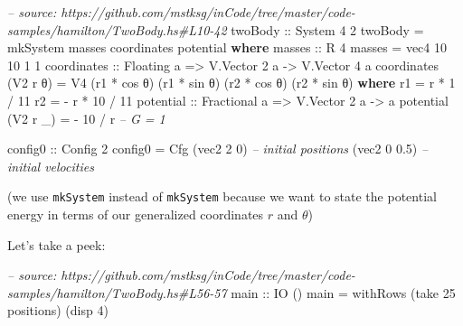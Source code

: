 \documentclass[]{article}
\newenvironment{Shaded}{}{}
\newcommand{\KeywordTok}[1]{\textcolor[rgb]{0.00,0.44,0.13}{\textbf{{#1}}}}
\newcommand{\DataTypeTok}[1]{\textcolor[rgb]{0.56,0.13,0.00}{{#1}}}
\newcommand{\DecValTok}[1]{\textcolor[rgb]{0.25,0.63,0.44}{{#1}}}
\newcommand{\FloatTok}[1]{\textcolor[rgb]{0.25,0.63,0.44}{{#1}}}
\newcommand{\CommentTok}[1]{\textcolor[rgb]{0.38,0.63,0.69}{\textit{{#1}}}}
\newcommand{\OtherTok}[1]{\textcolor[rgb]{0.00,0.44,0.13}{{#1}}}
\newcommand{\FunctionTok}[1]{\textcolor[rgb]{0.02,0.16,0.49}{{#1}}}
\newcommand{\NormalTok}[1]{{#1}}
\begin{document}
\begin{Shaded}
\begin{Highlighting}[]
\CommentTok{-- source: https://github.com/mstksg/inCode/tree/master/code-samples/hamilton/TwoBody.hs#L10-42}
\OtherTok{twoBody ::} \DataTypeTok{System} \DecValTok{4} \DecValTok{2}
\NormalTok{twoBody }\FunctionTok{=} \NormalTok{mkSystem masses coordinates potential}
  \KeywordTok{where}
\OtherTok{    masses ::} \DataTypeTok{R} \DecValTok{4}
    \NormalTok{masses }\FunctionTok{=} \NormalTok{vec4 }\DecValTok{10} \DecValTok{10} \DecValTok{1} \DecValTok{1}
    \NormalTok{coordinates}
\OtherTok{        ::} \DataTypeTok{Floating} \NormalTok{a}
        \OtherTok{=>} \DataTypeTok{V.Vector} \DecValTok{2} \NormalTok{a}
        \OtherTok{->} \DataTypeTok{V.Vector} \DecValTok{4} \NormalTok{a}
    \NormalTok{coordinates (}\DataTypeTok{V2} \NormalTok{r θ) }\FunctionTok{=} \DataTypeTok{V4} \NormalTok{(r1 }\FunctionTok{*} \NormalTok{cos θ) (r1 }\FunctionTok{*} \NormalTok{sin θ)}
                              \NormalTok{(r2 }\FunctionTok{*} \NormalTok{cos θ) (r2 }\FunctionTok{*} \NormalTok{sin θ)}
      \KeywordTok{where}
        \NormalTok{r1 }\FunctionTok{=}   \NormalTok{r }\FunctionTok{*}  \DecValTok{1} \FunctionTok{/} \DecValTok{11}
        \NormalTok{r2 }\FunctionTok{=} \FunctionTok{-} \NormalTok{r }\FunctionTok{*} \DecValTok{10} \FunctionTok{/} \DecValTok{11}
    \NormalTok{potential}
\OtherTok{        ::} \DataTypeTok{Fractional} \NormalTok{a}
        \OtherTok{=>} \DataTypeTok{V.Vector} \DecValTok{2} \NormalTok{a}
        \OtherTok{->} \NormalTok{a}
    \NormalTok{potential (}\DataTypeTok{V2} \NormalTok{r _) }\FunctionTok{=} \FunctionTok{-} \DecValTok{10} \FunctionTok{/} \NormalTok{r       }\CommentTok{-- G = 1}

\OtherTok{config0 ::} \DataTypeTok{Config} \DecValTok{2}
\NormalTok{config0 }\FunctionTok{=} \DataTypeTok{Cfg} \NormalTok{(vec2 }\DecValTok{2}   \DecValTok{0}\NormalTok{)  }\CommentTok{-- initial positions}
              \NormalTok{(vec2 }\DecValTok{0} \FloatTok{0.5}\NormalTok{)  }\CommentTok{-- initial velocities}
\end{Highlighting}
\end{Shaded}

(we use \texttt{mkSystem} instead of \texttt{mkSystem\textquotesingle{}} because
we want to state the potential energy in terms of our generalized coordinates
\(r\) and \(\theta\))

Let's take a peek:

\begin{Shaded}
\begin{Highlighting}[]
\CommentTok{-- source: https://github.com/mstksg/inCode/tree/master/code-samples/hamilton/TwoBody.hs#L56-57}
\OtherTok{main ::} \DataTypeTok{IO} \NormalTok{()}
\NormalTok{main }\FunctionTok{=} \NormalTok{withRows (take }\DecValTok{25} \NormalTok{positions) (disp }\DecValTok{4}\NormalTok{)}
\end{Highlighting}
\end{Shaded}
\end{document}
